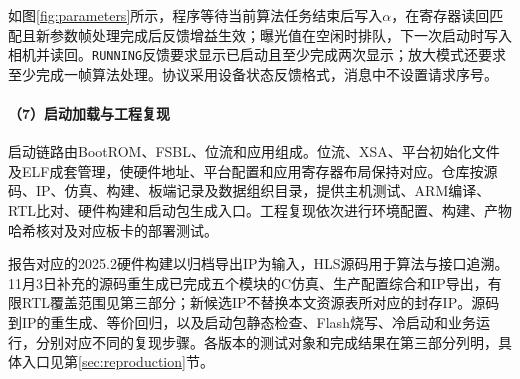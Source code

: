 如图\ref{fig:parameters}所示，程序等待当前算法任务结束后写入$\alpha$，在寄存器读回匹配且新参数帧处理完成后反馈增益生效；曝光值在空闲时排队，下一次启动时写入相机并读回。\texttt{RUNNING}反馈要求显示已启动且至少完成两次显示；放大模式还要求至少完成一帧算法处理。协议采用设备状态反馈格式，消息中不设置请求序号。

\paragraph{（7）启动加载与工程复现}
启动链路由BootROM、FSBL、位流和应用组成。位流、XSA、平台初始化文件及ELF成套管理，使硬件地址、平台配置和应用寄存器布局保持对应。仓库按源码、IP、仿真、构建、板端记录及数据组织目录，提供主机测试、ARM编译、RTL比对、硬件构建和启动包生成入口。工程复现依次进行环境配置、构建、产物哈希核对及对应板卡的部署测试。

报告对应的2025.2硬件构建以归档导出IP为输入，HLS源码用于算法与接口追溯。11月3日补充的源码重生成已完成五个模块的C仿真、生产配置综合和IP导出，有限RTL覆盖范围见第三部分；新候选IP不替换本文资源表所对应的封存IP。源码到IP的重生成、等价回归，以及启动包静态检查、Flash烧写、冷启动和业务运行，分别对应不同的复现步骤。各版本的测试对象和完成结果在第三部分列明，具体入口见第\ref{sec:reproduction}节。

